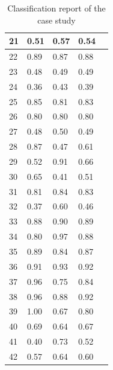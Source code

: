 \begin{table}[h!]
\begin{minipage}{.5\linewidth}
\begin{tabular}{| l | l | l | l | l |}
   \hline
   21   &    0.51   &   0.57  &    0.54 \\
   \hline
   22   &    0.89   &   0.87  &    0.88 \\
   \hline
   23   &    0.48   &   0.49  &    0.49 \\
   \hline
   24   &    0.36   &   0.43  &    0.39 \\
   \hline
   25   &    0.85   &   0.81  &    0.83 \\
   \hline
   26   &    0.80   &   0.80  &    0.80 \\
   \hline
   27   &    0.48   &   0.50  &    0.49 \\
   \hline
   28   &    0.87   &   0.47  &    0.61 \\
   \hline
   29   &    0.52   &   0.91  &    0.66 \\
   \hline
   30   &    0.65   &   0.41  &    0.51 \\
   \hline
   31   &    0.81   &   0.84  &    0.83 \\
   \hline
   32   &    0.37   &   0.60  &    0.46 \\
   \hline
   33   &    0.88   &   0.90  &    0.89 \\
   \hline
   34   &    0.80   &   0.97  &    0.88 \\
   \hline
   35   &    0.89   &   0.84  &    0.87 \\
   \hline
   36   &    0.91   &   0.93  &    0.92 \\
   \hline
   37   &    0.96   &   0.75  &    0.84 \\
   \hline
   38   &    0.96   &   0.88  &    0.92 \\
   \hline
   39   &    1.00   &   0.67  &    0.80 \\
   \hline
   40   &    0.69   &   0.64  &    0.67 \\
   \hline
   41   &    0.40   &   0.73  &    0.52 \\
   \hline
   42   &    0.57   &   0.64  &    0.60 \\
   \hline
  \end{tabular}
  \end{minipage}
\caption{Classification report of the case study}
\label{tab:original_report_1}
\end{table}
